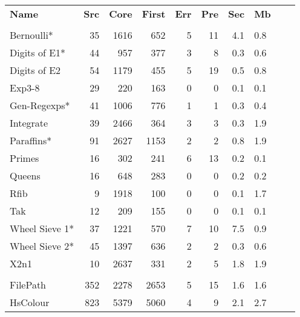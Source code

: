 \documentclass[preprint]{sigplanconf}
\begin{document}
\begin{table}
\begin{tabular*}{\linewidth}{lrrrrrrlll}
\textbf{Name} & \textbf{Src} & \textbf{Core} & \textbf{First} & \textbf{Err} & \textbf{Pre} & \textbf{Sec} & \textbf{Mb} \\
\vspace{-1ex} \\
Bernoulli*                   & 35 & 1616 &  652 & 5 & 11 & 4.1 & 0.8 \\
Digits of E1*  \hspace{-3mm} & 44 &  957 &  377 & 3 &  8 & 0.3 & 0.6 \\
Digits of E2   \hspace{-3mm} & 54 & 1179 &  455 & 5 & 19 & 0.5 & 0.8 \\
Exp3-8                       & 29 &  220 &  163 & 0 &  0 & 0.1 & 0.1 \\
Gen-Regexps*   \hspace{-3mm} & 41 & 1006 &  776 & 1 &  1 & 0.3 & 0.4 \\
Integrate                    & 39 & 2466 &  364 & 3 &  3 & 0.3 & 1.9 \\
Paraffins*                   & 91 & 2627 & 1153 & 2 &  2 & 0.8 & 1.9 \\
Primes                       & 16 &  302 &  241 & 6 & 13 & 0.2 & 0.1 \\
Queens                       & 16 &  648 &  283 & 0 &  0 & 0.2 & 0.2 \\
Rfib                         &  9 & 1918 &  100 & 0 &  0 & 0.1 & 1.7 \\
Tak                          & 12 &  209 &  155 & 0 &  0 & 0.1 & 0.1 \\
Wheel Sieve 1* \hspace{-3mm} & 37 & 1221 &  570 & 7 & 10 & 7.5 & 0.9 \\
Wheel Sieve 2* \hspace{-3mm} & 45 & 1397 &  636 & 2 &  2 & 0.3 & 0.6 \\
X2n1                         & 10 & 2637 &  331 & 2 &  5 & 1.8 & 1.9 \\
\vspace{-1ex} \\
FilePath      \hspace{-3mm} & 352 & 2278 & 2653 & 5 & 15 & 1.6 & 1.6 \\
HsColour      \hspace{-3mm} & 823 & 5379 & 5060 & 4 &  9 & 2.1 & 2.7 \\
\hline
\end{tabular*}
\end{table}
\end{document}
